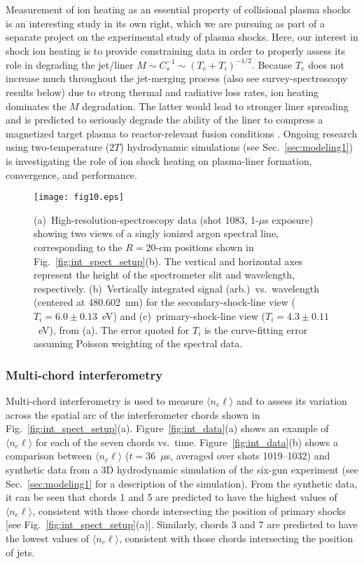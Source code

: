\documentclass[journal]{IEEEtran}
\begin{document}
Measurement of ion heating as an essential
property of collisional plasma shocks \cite{jaffrin64}
is an interesting study in its own right, which we are pursuing as part of a
separate project on the experimental study of plasma shocks.  Here,
our interest in shock ion heating is to provide constraining data in order
to properly assess its role in degrading the jet/liner $M
\sim C_s^{-1} \sim (T_e + T_i)^{-1/2}$.
Because $T_e$ does not increase much throughout the
jet-merging process \cite{merritt14,moser15pop} (also see survey-spectroscopy results
below) due to strong thermal and radiative loss rates, ion heating dominates the
$M$ degradation.  The latter would lead to stronger liner spreading
and is predicted to seriously degrade the ability of the liner to compress a magnetized target
plasma to reactor-relevant fusion conditions \cite{langendorf17pop}.  Ongoing research
using two-temperature ($2T$) hydrodynamic simulations (see Sec.~\ref{sec:modeling1})
is investigating the role of ion shock heating on plasma-liner formation, convergence, and
performance.

\begin{figure}[!tb]
\centering
\texttt{[image: fig10.eps]}
\caption{(a)~High-resolution-spectroscopy
data (shot 1083, 1-$\mu$s exposure)
showing two views of a singly ionized argon spectral line, corresponding
to the $R=20$-cm positions shown in Fig.~\ref{fig:int_spect_setup}(b).  The vertical
and horizontal axes represent the height of the spectrometer slit and wavelength, respectively.
(b)~Vertically integrated signal (arb.)\ vs.\ wavelength (centered at 480.602~nm) for the 
secondary-shock-line view ($T_i=6.0\pm 0.13$~eV) and (c)~primary-shock-line view
($T_i=4.3\pm 0.11$~eV), from (a).  The error quoted for $T_i$ is the curve-fitting error
assuming Poisson weighting of the spectral data.}
\label{fig:spect_hi-res}
\end{figure}

\subsubsection{Multi-chord interferometry}
\label{sec:interferometry}

Multi-chord interferometry is used to measure 
$\langle n_e \ell \rangle$ and to assess its
variation across the spatial arc of the interferometer chords shown in 
Fig.~\ref{fig:int_spect_setup}(a).  Figure~\ref{fig:int_data}(a) shows an example of $\langle n_e \ell \rangle$
for each of the seven chords vs.\ time.  Figure~\ref{fig:int_data}(b) shows a comparison
between $\langle n_e \ell \rangle$ ($t=36$~$\mu$s, averaged over shots 1019--1032) and
synthetic data from a 3D hydrodynamic simulation of the six-gun experiment (see Sec.~\ref{sec:modeling1} for a description of the simulation).  From the synthetic data, it can be seen that chords 1 and 5 are predicted to have the highest values of
$\langle n_e \ell \rangle$, consistent with those chords intersecting the position of
primary shocks [see Fig.~\ref{fig:int_spect_setup}(a)].  Similarly, chords 3 and 7 are predicted to have the
lowest values of $\langle n_e \ell \rangle$, consistent with those chords intersecting the position
of jets.
\end{document}
